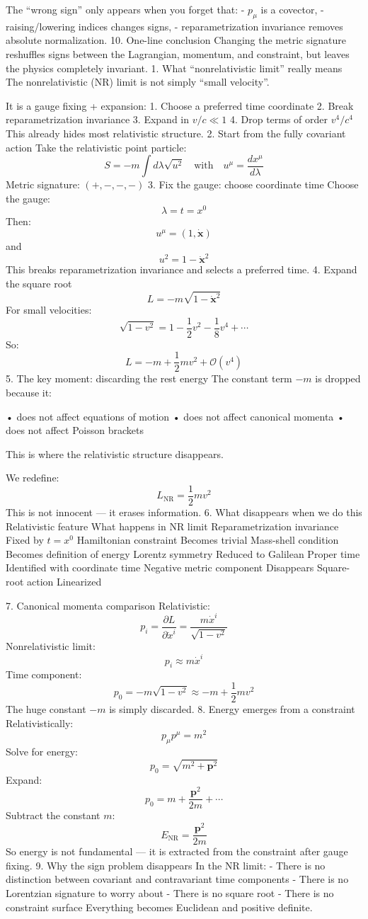 The “wrong sign” only appears when you forget that:
- \(p_\mu\) is a covector,
- raising/lowering indices changes signs,
- reparametrization invariance removes absolute normalization.
10. One-line conclusion
Changing the metric signature reshuffles signs between the Lagrangian, momentum, and constraint, but leaves the physics completely invariant.
1. What “nonrelativistic limit” really means
The nonrelativistic (NR) limit is not simply “small velocity”.

It is a gauge fixing + expansion:
1. Choose a preferred time coordinate
2. Break reparametrization invariance
3. Expand in \(v/c \ll 1\)
4. Drop terms of order \(v^4/c^4\)
This already hides most relativistic structure.
2. Start from the fully covariant action
Take the relativistic point particle:
\[
S = -m \int d\lambda \sqrt{u^2}
\quad\text{with}\quad
u^\mu = \frac{dx^\mu}{d\lambda}
\]
Metric signature: \((+,-,-,-)\)
3. Fix the gauge: choose coordinate time
Choose the gauge:
\[
\lambda = t = x^0
\]
Then:
\[
u^\mu = (1, \dot{\mathbf{x}})
\]
and
\[
u^2 = 1 - \dot{\mathbf{x}}^2
\]
This breaks reparametrization invariance and selects a preferred time.
4. Expand the square root
\[
L = -m \sqrt{1 - \dot{\mathbf{x}}^2}
\]
For small velocities:
\[
\sqrt{1 - v^2}
= 1 - \frac{1}{2}v^2 - \frac{1}{8}v^4 + \cdots
\]
So:
\[
L = -m + \frac{1}{2} m v^2 + \mathcal{O}(v^4)
\]
5. The key moment: discarding the rest energy
The constant term \(-m\) is dropped because it:

• does not affect equations of motion
• does not affect canonical momenta
• does not affect Poisson brackets  

This is where the relativistic structure disappears.

We redefine:
\[
L_{\text{NR}} = \frac{1}{2} m v^2
\]
This is not innocent — it erases information.
6. What disappears when we do this
Relativistic feature	What happens in NR limit
Reparametrization invariance	Fixed by \(t = x^0\)
Hamiltonian constraint	Becomes trivial
Mass-shell condition	Becomes definition of energy
Lorentz symmetry	Reduced to Galilean
Proper time	Identified with coordinate time
Negative metric component	Disappears
Square-root action	Linearized


7. Canonical momenta comparison
Relativistic:
\[
p_i = \frac{\partial L}{\partial \dot{x}^i}
= \frac{m \dot{x}^i}{\sqrt{1 - v^2}}
\]
Nonrelativistic limit:
\[
p_i \approx m \dot{x}^i
\]
Time component:
\[
p_0 = -m \sqrt{1 - v^2} \approx -m + \frac{1}{2}mv^2
\]
The huge constant \(-m\) is simply discarded.
8. Energy emerges from a constraint
Relativistically:
\[
p_\mu p^\mu = m^2
\]
Solve for energy:
\[
p_0 = \sqrt{m^2 + \mathbf{p}^2}
\]
Expand:
\[
p_0 = m + \frac{\mathbf{p}^2}{2m} + \cdots
\]
Subtract the constant \(m\):
\[
E_{\text{NR}} = \frac{\mathbf{p}^2}{2m}
\]
So energy is not fundamental — it is extracted from the constraint after gauge fixing.
9. Why the sign problem disappears
In the NR limit:
- There is no distinction between covariant and contravariant time components
- There is no Lorentzian signature to worry about
- There is no square root
- There is no constraint surface
Everything becomes Euclidean and positive definite.

